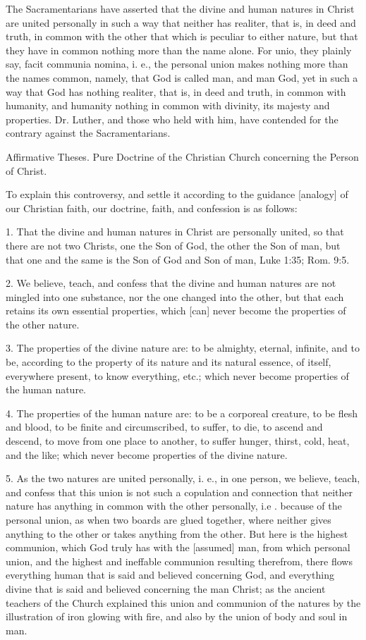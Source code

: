The Sacramentarians have asserted that the divine and human natures in Christ are united personally in such a way that neither has realiter, that is, in deed and truth, in common with the other that which is peculiar to either nature, but that they have in common nothing more than the name alone. For unio, they plainly say, facit communia nomina, i. e., the personal union makes nothing more than the names common, namely, that God is called man, and man God, yet in such a way that God has nothing realiter, that is, in deed and truth, in common with humanity, and humanity nothing in common with divinity, its majesty and properties. Dr. Luther, and those who held with him, have contended for the contrary against the Sacramentarians.

Affirmative Theses.
Pure Doctrine of the Christian Church concerning the Person of Christ.

To explain this controversy, and settle it according to the guidance [analogy] of our Christian faith, our doctrine, faith, and confession is as follows:

1. That the divine and human natures in Christ are personally united, so that there are not two Christs, one the Son of God, the other the Son of man, but that one and the same is the Son of God and Son of man, Luke 1:35; Rom. 9:5.

2. We believe, teach, and confess that the divine and human natures are not mingled into one substance, nor the one changed into the other, but that each retains its own essential properties, which [can] never become the properties of the other nature.

3. The properties of the divine nature are: to be almighty, eternal, infinite, and to be, according to the property of its nature and its natural essence, of itself, everywhere present, to know everything, etc.; which never become properties of the human nature.

4. The properties of the human nature are: to be a corporeal creature, to be flesh and blood, to be finite and circumscribed, to suffer, to die, to ascend and descend, to move from one place to another, to suffer hunger, thirst, cold, heat, and the like; which never become properties of the divine nature.

5. As the two natures are united personally, i. e., in one person, we believe, teach, and confess that this union is not such a copulation and connection that neither nature has anything in common with the other personally, i.e . because of the personal union, as when two boards are glued together, where neither gives anything to the other or takes anything from the other. But here is the highest communion, which God truly has with the [assumed] man, from which personal union, and the highest and ineffable communion resulting therefrom, there flows everything human that is said and believed concerning God, and everything divine that is said and believed concerning the man Christ; as the ancient teachers of the Church explained this union and communion of the natures by the illustration of iron glowing with fire, and also by the union of body and soul in man.

